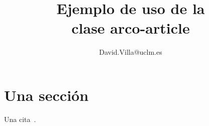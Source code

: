 \documentclass{arco-article}
\title{Ejemplo de uso de la\\clase arco-article}
\author{David.Villa@uclm.es}
\begin{document}
\maketitle

\section{Una sección}



Una cita~\cite{Cannon}.


\end{document}
